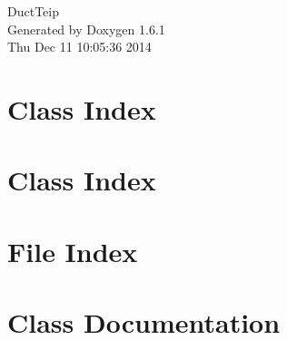 \documentclass[a4paper]{book}
\begin{document}
\hypersetup{pageanchor=false}
\begin{titlepage}
\vspace*{7cm}
\begin{center}
{\Large DuctTeip }\\
\vspace*{1cm}
{\large Generated by Doxygen 1.6.1}\\
\vspace*{0.5cm}
{\small Thu Dec 11 10:05:36 2014}\\
\end{center}
\end{titlepage}
\clearemptydoublepage
{}
\tableofcontents
\clearemptydoublepage
{}
\hypersetup{pageanchor=true}
\chapter{Class Index}

\chapter{Class Index}

\chapter{File Index}

\chapter{Class Documentation}





















































\end{document}
